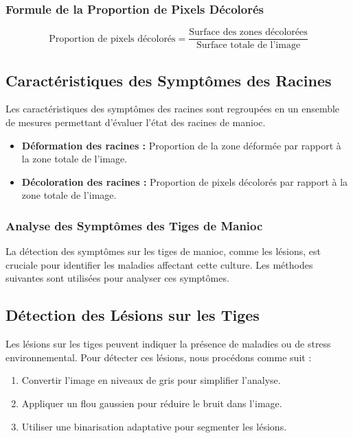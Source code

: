 \documentclass{article}
\begin{document}
	\subsubsection*{Formule de la Proportion de Pixels Décolorés}
	\[
	\text{Proportion de pixels décolorés} = \frac{\text{Surface des zones décolorées}}{\text{Surface totale de l'image}}
	\]
	
	\subsection*{Caractéristiques des Symptômes des Racines}
	
	Les caractéristiques des symptômes des racines sont regroupées en un ensemble de mesures permettant d'évaluer l'état des racines de manioc.
	
	\begin{itemize}
		\item \textbf{Déformation des racines :} Proportion de la zone déformée par rapport à la zone totale de l'image.
		\item \textbf{Décoloration des racines :} Proportion de pixels décolorés par rapport à la zone totale de l'image.
	\end{itemize}
	
	\subsubsection{Analyse des Symptômes des Tiges de Manioc}
	
	La détection des symptômes sur les tiges de manioc, comme les lésions, est cruciale pour identifier les maladies affectant cette culture. Les méthodes suivantes sont utilisées pour analyser ces symptômes.
	
	\subsection*{Détection des Lésions sur les Tiges}
	
	Les lésions sur les tiges peuvent indiquer la présence de maladies ou de stress environnemental. Pour détecter ces lésions, nous procédons comme suit :
	\begin{enumerate}
		\item Convertir l'image en niveaux de gris pour simplifier l'analyse.
		\item Appliquer un flou gaussien pour réduire le bruit dans l'image.
		\item Utiliser une binarisation adaptative pour segmenter les lésions.
	\end{enumerate}
	
\end{document}

